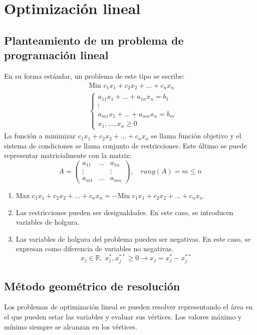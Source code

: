 \chapter{Optimización lineal}
\section{Planteamiento de un problema de programación lineal}
En su forma estándar, un problema de este tipo se escribe:
\begin{align*}
     & \text{Min } c_1x_1 + c_2x_2 + \dots + c_nx_n \\
     & \begin{cases}
           a_{11}x_1 + \dots + a_{1n}x_n = b_1 \\
           \vdots                              \\
           a_{m1}x_1 + \dots + a_{mn}x_n = b_m \\
           x_1, \dots, x_n \geq 0
       \end{cases}
\end{align*}
La función a minimizar $c_1x_1 + c_2x_2 + \dots + c_nx_n$ se llama función objetivo y el sistema de condiciones se llama conjunto de restricciones.
Este último se puede representar matricialmente con la matriz:
$$A = \begin{pmatrix}
        a_{11} & \dots & a_{1n} \\
        \vdots &       & \vdots \\
        a_{m1} & \dots & a_{mn}
    \end{pmatrix}, \quad rang(A) = m \leq n$$

\begin{remark}
    \hfill
    \begin{enumerate}
        \item $\text{Max } c_1x_1 + c_2x_2 + \dots + c_nx_n = -\text{Min } c_1x_1 + c_2x_2 + \dots + c_nx_n$.
        \item Las restricciones pueden ser desigualdades.
              En este caso, se introducen variables de holgura.
        \item Las variables de holgura del problema pueden ser negativas.
              En este caso, se expresan como diferencia de variables no negativas.
              $$x_j \in \mathbb{R}, \; x_j^\ast, x_j^{\ast\ast} \geq 0 \to x_j = x_j^\ast - x_j^{\ast\ast}$$
    \end{enumerate}
\end{remark}

\section{Método geométrico de resolución}
Los problemas de optimización lineal se pueden resolver representando el área en el que pueden estar las variables y evaluar sus vértices.
Los valores máximo y mínimo siempre se alcanzan en los vértices.

